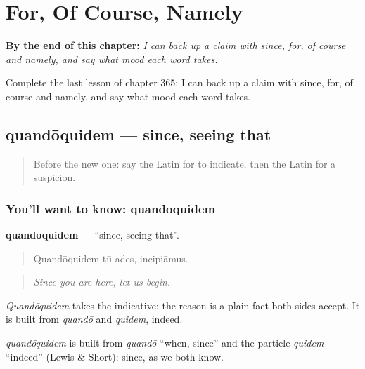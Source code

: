 
\chapter{For, Of Course, Namely}
\label{ch:la-for-of-course-namely}

\begin{chapteropening}
\textbf{By the end of this chapter:} \emph{I can back up a claim with since, for, of course and namely, and say what mood each word takes.}

Complete the last lesson of chapter 365: I can back up a claim with since, for, of course and namely, and say what mood each word takes.
\end{chapteropening}

\section[quandōquidem]{quandōquidem — since, seeing that}

\label{lesson:LA-C365-quandoquidem}



\begin{quote}
Before the new one: say the Latin for to indicate, then the Latin for a suspicion.
\end{quote}

\subsection*{You'll want to know: quandōquidem}
\textbf{quandōquidem} — \textquotedblleft{}since, seeing that\textquotedblright{}.

\begin{quote}
Quandōquidem tū ades, incipiāmus.
\end{quote}

\begin{quote}
\emph{Since you are here, let us begin.}
\end{quote}

\emph{Quandōquidem} takes the indicative: the reason is a plain fact both sides accept. It is built from \emph{quandō} and \emph{quidem}, indeed.

\begin{cousinweb}
\emph{quandōquidem} is built from \emph{quandō} \textquotedblleft{}when, since\textquotedblright{} and the particle \emph{quidem} \textquotedblleft{}indeed\textquotedblright{} (Lewis \& Short): since, as we both know.
\end{cousinweb}

